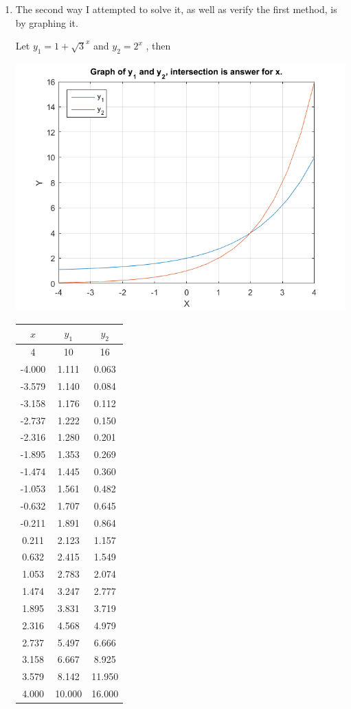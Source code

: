\documentclass[12pt]{article}
\begin{document}
\begin{enumerate}[label=\textbf{\arabic*}.]
\newpage

\item The second way I attempted to solve it, as well as verify the first method, is by graphing it.

Let $y_1 = 1 + \sqrt{3}^x$ and $y_2 = 2^{x}$ , then

\begin{minipage}{.68\linewidth}
\includegraphics[scale=0.60]{Part2Graph.png}
\end{minipage}
\begin{minipage}{.3\linewidth}
\begin{tabular}{c | c | c}
$x$ & $y_1$ & $y_2$ \\
\hline
4	&	10	&	16 \\
\hline
-4.000	&	1.111	&	0.063	\\
\hline
-3.579	&	1.140	&	0.084	\\
\hline
-3.158	&	1.176	&	0.112	\\
\hline
-2.737	&	1.222	&	0.150	\\
\hline
-2.316	&	1.280	&	0.201	\\
\hline
-1.895	&	1.353	&	0.269	\\
\hline
-1.474	&	1.445	&	0.360	\\
\hline
-1.053	&	1.561	&	0.482	\\
\hline
-0.632	&	1.707	&	0.645	\\
\hline
-0.211	&	1.891	&	0.864	\\
\hline
0.211	&	2.123	&	1.157	\\
\hline
0.632	&	2.415	&	1.549	\\
\hline
1.053	&	2.783	&	2.074	\\
\hline
1.474	&	3.247	&	2.777	\\
\hline
\rowcolor{yellow!50}1.895	&	3.831	&	3.719	\\
\hline
\rowcolor{yellow!50}2.316	&	4.568	&	4.979	\\
\hline
2.737	&	5.497	&	6.666	\\
\hline
3.158	&	6.667	&	8.925	\\
\hline
3.579	&	8.142	&	11.950	\\
\hline
4.000	&	10.000	&	16.000	\\
\end{tabular}


\end{minipage}
\end{enumerate}
\end{document}
